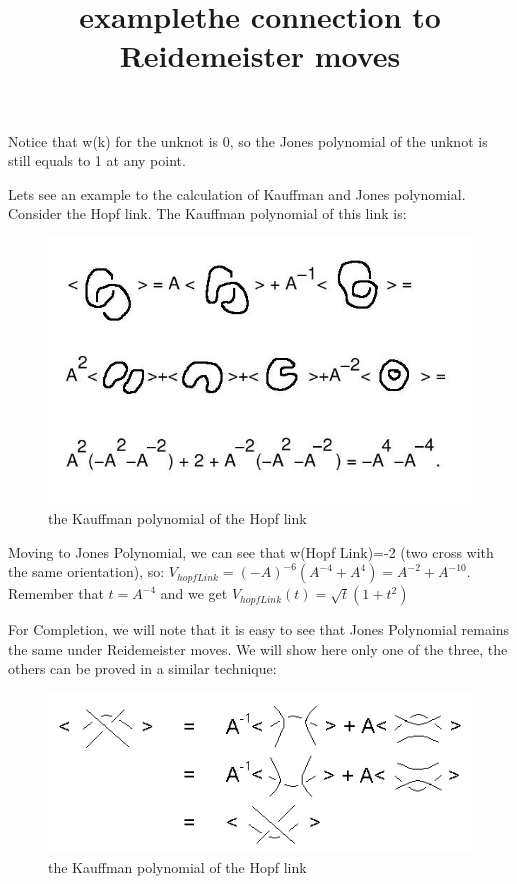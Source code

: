 \documentclass{article}
\begin{document}
Notice that w(k) for the unknot is 0, so the Jones polynomial of the unknot is still equals to 1 at any point.



\title{example}
Lets see an example to the calculation of Kauffman and Jones polynomial. Consider the Hopf link.
The Kauffman polynomial of this link is:
\begin{figure}
\includegraphics[scale=0.15]{hopf_link} 
\caption{the Kauffman polynomial of the Hopf link}
\end{figure}

Moving to Jones Polynomial, we can see that w(Hopf Link)=-2 (two cross with the same orientation), so:
$V_{hopfLink}=(-A)^{-6}(A^{-4}+A^{4}) = A^{-2} + A^{-10}$.
Remember that $t = A^{-4}$ and we get $V_{hopfLink}(t)=\sqrt{t}(1+t^{2})$  



\title{the connection to Reidemeister moves}
For Completion, we will note that it is easy to see that Jones Polynomial remains the same
under Reidemeister moves. We will show here only one of the three, the others can be proved in a similar technique:
\begin{figure}
\includegraphics[scale=1]{jones_and_reidimister.jpg} 
\caption{the Kauffman polynomial of the Hopf link}
\end{figure}  
\end{document}
